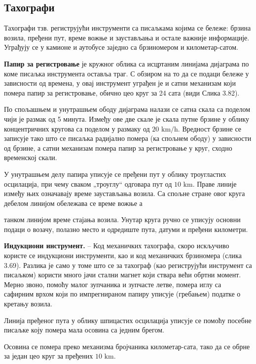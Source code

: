 \documentclass[12pt,a4paper]{report}
\begin{document}
\subsection{Тахографи}

Тахографи тзв. региструјући инструменти са писаљкама којима се бележе: брзина возила, пређени пут, време вожње и заустављања и остале важније информације. Уграђују се у камионе и аутобусе заједно са брзиномером и километар-сатом.

\textbf{Папир за регистровање} је кружног облика са исцртаним линијама дијаграма по коме писаљка инструмента оставља траг. С обзиром на то да се подаци бележе у зависности од времена, у овај инструмент уграђен је и сатни механизам који помера папир за регистровање, обично цео круг за 24 сата (види Слика 3.82).

По спољашњем и унутрашњем ободу дијаграма налази се сатна скала са поделом чији је размак од 5 минута. Између ове две скале је скала путне брзине у облику концентричних кругова са поделом у размаку од $20\text{ km/h}$. Вредност брзине се записује тако што се писаљка радијално помера (ка спољнем ободу) у зависности од брзине, а сатни механизам помера папир за регистровање у круг, сходно временској скали.

У унутрашњем делу папира уписује се пређени пут у облику троугластих осцилација, при чему сваком „троуглу“ одговара пут од $10\text{ km}$. Праве линије између њих означавају време заустављања возила. Са спољне стране овог круга дебелом линијом обележава се време вожње а

танком линијом време стајања возила. Унутар круга ручно се уписују основни подаци о возачу, полазно место и одредиште пута, датуми и пређени километри.

\textbf{Индукциони инструмент.} – Код механичких тахографа, скоро искључиво користе се индукциони инструменти, као и код механичких брзиномера (слика 3.69). Разлика је само у томе што се за тахограф (као региструјући инструмент са писаљком) користи много јачи стални магнет који ствара већи обртни момент. Мерно звоно, помоћу малог зупчаника и зупчасте летве, помера иглу са сафирним врхом који по импрегнираном папиру уписује (гребањем) податке о кретању возила.

Линија пређеног пута у облику шпицастих осцилација уписује се помоћу посебне писаљке коју помера мала осовина са једним брегом.

Осовина се помера преко механизма бројчаника километар-сата, тако да се обрне за један цео круг за пређених $10\text{ km}$.
\end{document}
